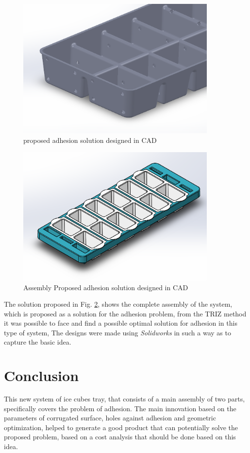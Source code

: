 \documentclass[12pt, twoside]{report}
\begin{document}
\begin{figure}[H]
    \centering
    \includegraphics[width=100mm,scale=0.8]{images/Project2/innov3d1.png}
    \caption{proposed adhesion solution designed in CAD}
    \label{fig:sol21x}
\end{figure}
\begin{figure}[H]
    \centering
    \includegraphics[width=100mm,scale=0.8]{images/Project2/cad2.png}
    \caption{Assembly Proposed adhesion solution designed in CAD}
    \label{fig:Assemb2}
\end{figure}
The solution proposed in Fig. \ref{fig:Assemb2}, shows the complete assembly of the system, which is proposed as a solution for the adhesion problem, from the TRIZ method it was possible to face and find a possible optimal solution for adhesion in this type of system, The designs were made using \textit{Solidworks} in such a way as to capture the basic idea.
\section{Conclusion}

This new system of ice cubes tray, that consists of a main assembly of two parts, specifically covers the problem of adhesion. The main innovation based on the parameters of corrugated surface, holes against adhesion and geometric optimization, helped to generate a good product that can potentially solve the proposed problem, based on a cost analysis that should be done based on this idea.
\end{document}
